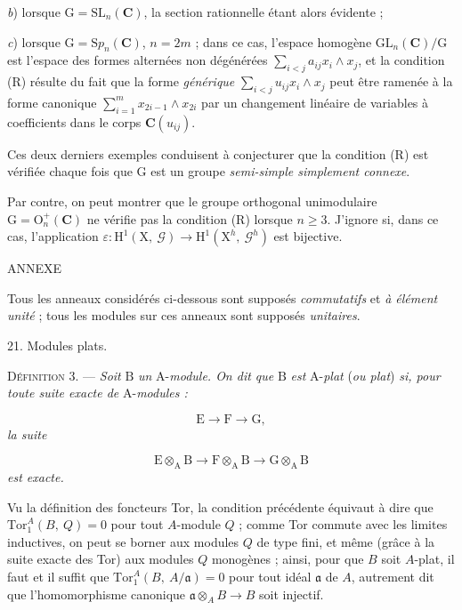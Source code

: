 \textit{b}) lorsque $\mathrm{G} = \mathrm{SL}_n(\mathbf{C})$, la section rationnelle étant alors évidente ;

\textit{c}) lorsque $\mathrm{G} = \mathrm{S}p_n(\mathbf{C})$, $n = 2m$ ; dans ce cas, l'espace homogène $\mathrm{GL}_n(\mathbf{C})/\mathrm{G}$ est l'espace des formes alternées non dégénérées $\sum\limits_{i<j} a_{ij} x_i \wedge x_j$, et la condition (R) résulte du fait que la forme \textit{générique} $\sum\limits_{i<j} u_{ij} x_i \wedge x_j$ peut être ramenée à la forme canonique $\sum\limits_{i=1}^{m} x_{2i-1} \wedge x_{2i}$ par un changement linéaire de variables à coefficients dans le corps $\mathbf{C}(u_{ij})$.

Ces deux derniers exemples conduisent à conjecturer que la condition (R) est vérifiée chaque fois que $\mathrm{G}$ est un groupe \textit{semi-simple simplement connexe}.

Par contre, on peut montrer que le groupe orthogonal unimodulaire $\mathrm{G} = \mathrm{O}_n^+(\mathbf{C})$ ne vérifie pas la condition (R) lorsque $n \geqslant 3$. J'ignore si, dans ce cas, l'application $\varepsilon : \mathrm{H}^1(\mathrm{X},\ \mathcal{G}) \to \mathrm{H}^1(\mathrm{X}^h,\ \mathcal{G}^h)$ est bijective.


ANNEXE

Tous les anneaux considérés ci-dessous sont supposés \textit{commutatifs} et \textit{à élément unité} ; tous les modules sur ces anneaux sont supposés \textit{unitaires}.


21. Modules plats.

\textsc{Définition} 3. --- \textit{Soit} $\mathrm{B}$ \textit{un} $\mathrm{A}$-\textit{module. On dit que} $\mathrm{B}$ \textit{est} $\mathrm{A}$-\textit{plat} (\textit{ou plat}) \textit{si, pour toute suite exacte de} $\mathrm{A}$-\textit{modules :}

\begin{equation*}
\mathrm{E} \to \mathrm{F} \to \mathrm{G},
\end{equation*}
\textit{la suite}

\begin{equation*}
\mathrm{E} \otimes_{\mathrm{A}} \mathrm{B} \to \mathrm{F} \otimes_{\mathrm{A}} \mathrm{B} \to \mathrm{G} \otimes_{\mathrm{A}} \mathrm{B}
\end{equation*}
\textit{est exacte.}



Vu la définition des foncteurs Tor, la condition précédente équivaut à dire que $\mathrm{Tor}_1^{A}(B,\ Q) = 0$ pour tout $A$-module $Q$ ; comme Tor commute avec les limites inductives, on peut se borner aux modules $Q$ de type fini, et même (grâce à la suite exacte des Tor) aux modules $Q$ monogènes ; ainsi, pour que $B$ soit $A$-plat, il faut et il suffit que $\mathrm{Tor}_1^{A}(B,\ A/\mathfrak{a}) = 0$ pour tout idéal $\mathfrak{a}$ de $A$, autrement dit que l'homomorphisme canonique $\mathfrak{a} \otimes_A B \to B$ soit injectif.

